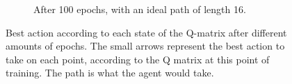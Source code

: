 \begin{figure}[H]
\begin{subfigure}[t]{.42\textwidth}
		\caption{After 100 epochs, with an ideal path of length 16.}
	\end{subfigure}
	\caption{Best action according to each state of the Q-matrix after different amounts of epochs. The small arrows represent the best action to take on each point, according to the Q matrix at this point of training. The path is what the agent would take.}
\end{figure}
